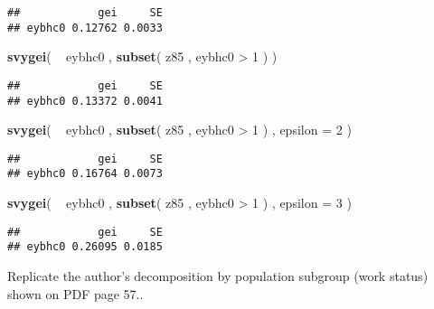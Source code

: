 \documentclass[]{book}
\newenvironment{Shaded}{\begin{snugshade}}{\end{snugshade}}
\newcommand{\KeywordTok}[1]{\textcolor[rgb]{0.13,0.29,0.53}{\textbf{{#1}}}}
\newcommand{\DataTypeTok}[1]{\textcolor[rgb]{0.13,0.29,0.53}{{#1}}}
\newcommand{\DecValTok}[1]{\textcolor[rgb]{0.00,0.00,0.81}{{#1}}}
\newcommand{\StringTok}[1]{\textcolor[rgb]{0.31,0.60,0.02}{{#1}}}
\newcommand{\NormalTok}[1]{{#1}}
\theoremstyle{definition}
\theoremstyle{definition}
\theoremstyle{remark}
\begin{document}
\begin{verbatim}
##            gei     SE
## eybhc0 0.12762 0.0033
\end{verbatim}

\begin{Shaded}
\begin{Highlighting}[]
\KeywordTok{svygei}\NormalTok{( ~}\StringTok{ }\NormalTok{eybhc0 , }\KeywordTok{subset}\NormalTok{( z85 , eybhc0 >}\StringTok{ }\DecValTok{1} \NormalTok{) )}
\end{Highlighting}
\end{Shaded}

\begin{verbatim}
##            gei     SE
## eybhc0 0.13372 0.0041
\end{verbatim}

\begin{Shaded}
\begin{Highlighting}[]
\KeywordTok{svygei}\NormalTok{( ~}\StringTok{ }\NormalTok{eybhc0 , }\KeywordTok{subset}\NormalTok{( z85 , eybhc0 >}\StringTok{ }\DecValTok{1} \NormalTok{) , }\DataTypeTok{epsilon =} \DecValTok{2} \NormalTok{)}
\end{Highlighting}
\end{Shaded}

\begin{verbatim}
##            gei     SE
## eybhc0 0.16764 0.0073
\end{verbatim}

\begin{Shaded}
\begin{Highlighting}[]
\KeywordTok{svygei}\NormalTok{( ~}\StringTok{ }\NormalTok{eybhc0 , }\KeywordTok{subset}\NormalTok{( z85 , eybhc0 >}\StringTok{ }\DecValTok{1} \NormalTok{) , }\DataTypeTok{epsilon =} \DecValTok{3} \NormalTok{)}
\end{Highlighting}
\end{Shaded}

\begin{verbatim}
##            gei     SE
## eybhc0 0.26095 0.0185
\end{verbatim}

Replicate the author's decomposition by population subgroup (work
status) shown on PDF page 57..
\end{document}
